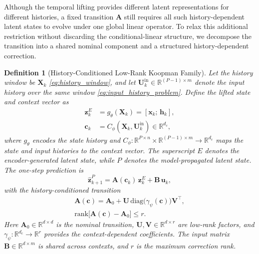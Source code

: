 \documentclass[journal]{IEEEtran}
\newtheorem{definition}{Definition}
\newcommand{\vx}{\mathbf{x}}
\newcommand{\vu}{\mathbf{u}}
\newcommand{\vz}{\mathbf{z}}
\newcommand{\vh}{\mathbf{h}}
\newcommand{\mA}{\mathbf{A}}
\newcommand{\mB}{\mathbf{B}}
\newcommand{\mX}{\mathbf{X}}
\newcommand{\mU}{\mathbf{U}}
\newcommand{\mV}{\mathbf{V}}
\newcommand{\vc}{\mathbf{c}}
\begin{document}
Although the temporal lifting provides different latent representations for different histories, a fixed transition $\mA$ still requires all such history-dependent latent states to evolve under one global linear operator. To relax this additional restriction without discarding the conditional-linear structure, we decompose the transition into a shared nominal component and a structured history-dependent correction.

\begin{definition}[History-Conditioned Low-Rank Koopman Family]
\label{def:hcltk}
Let the history window be $\mX_k$ \eqref{eq:history_window}, and let $\mU^{\mathrm{in}}_k\in\mathbb{R}^{(P-1)\times m}$ denote the input history over the same window \eqref{eq:input_history_problem}. Define the lifted state and context vector as
\begin{equation}
\begin{aligned}
    \vz^{E}_k &= g_\theta(\mX_k) = [\vx_k;\,\vh_k],\\
    \vc_k &= C_\phi(\mX_k,\mU^{\mathrm{in}}_k) \in \mathbb{R}^{d_c},
\end{aligned}
    \label{eq:context_vector}
\end{equation}
where $g_\theta$ encodes the state history and $C_\phi:\mathbb{R}^{P\times n}\times\mathbb{R}^{(P-1)\times m}\to\mathbb{R}^{d_c}$ maps the state and input histories to the context vector. The superscript $E$ denotes the encoder-generated latent state, while $P$ denotes the model-propagated latent state. The one-step prediction is
\begin{equation}
    \hat{\vz}^{P}_{k+1} = \mA(\vc_k)\,\vz^{E}_k + \mB\,\vu_k,
    \label{eq:temporal_dynamics}
\end{equation}
with the \emph{history-conditioned} transition
\begin{equation}
    \begin{gathered}
        \mA(\vc) = \mA_0
        + \mU\,\mathrm{diag}\bigl(\gamma_\psi(\vc)\bigr)\mV^\top,\\[3pt]
        \mathrm{rank}\bigl[\mA(\vc)-\mA_0\bigr]\le r.
    \end{gathered}
    \label{eq:lowrank_A}
\end{equation}
Here $\mA_0\in\mathbb{R}^{d\times d}$ is the nominal transition, $\mU,\mV\in\mathbb{R}^{d\times r}$ are low-rank factors, and $\gamma_\psi:\mathbb{R}^{d_c}\to\mathbb{R}^r$ provides the context-dependent coefficients. The input matrix $\mB\in\mathbb{R}^{d\times m}$ is shared across contexts, and $r$ is the maximum correction rank.
\end{definition}
\end{document}
